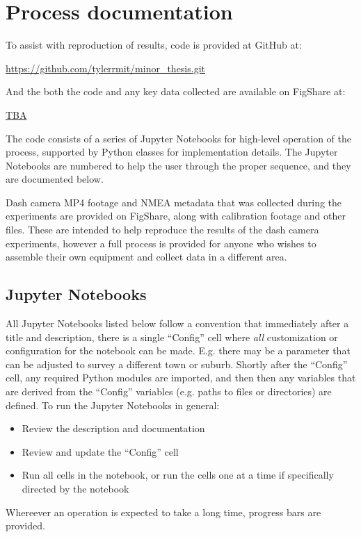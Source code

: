 \documentclass[11pt,twoside]{report}
\begin{document}

\appendix

\chapter{Process documentation}
\label{a:process}

To assist with reproduction of results, code is provided at GitHub at:

\url{https://github.com/tylerrmit/minor_thesis.git}

And the both the code and any key data collected are available on FigShare at:

\url{TBA}

The code consists of a series of Jupyter Notebooks for high-level operation of the process, supported by Python classes for implementation details.  The Jupyter Notebooks are numbered to help the user through the proper sequence, and they are documented below.

Dash camera MP4 footage and NMEA metadata that was collected during the experiments are provided on FigShare, along with calibration footage and other files.  These are intended to help reproduce the results of the dash camera experiments, however a full process is provided for anyone who wishes to assemble their own equipment and collect data in a different area.

\section{Jupyter Notebooks}
\label{aj}

All Jupyter Notebooks listed below follow a convention that immediately after a title and description, there is a single ``Config'' cell where \textit{all} customization or configuration for the notebook can be made.  E.g. there may be a parameter that can be adjusted to survey a different town or suburb.  Shortly after the ``Config'' cell, any required Python modules are imported, and then then any variables that are derived from the ``Config'' variables (e.g. paths to files or directories) are defined.  To run the Jupyter Notebooks in general:

\begin{itemize}
\item{Review the description and documentation}
\item{Review and update the ``Config'' cell}
\item{Run all cells in the notebook, or run the cells one at a time if specifically directed by the notebook}	
\end{itemize}
Whereever an operation is expected to take a long time, progress bars are provided.
\end{document}
